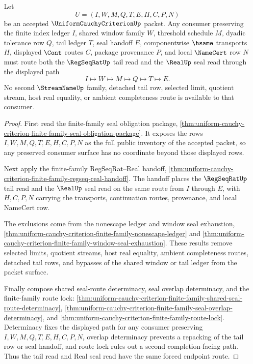 \begin{theorem}
\label{thm:uniform-cauchy-criterion-finite-family-tail-seal-coprovenance-lock}
Let
$$
U=(I,W,M,Q,T,E,H,C,P,N)
$$
be an accepted $\UniformCauchyCriterionUp$ packet. Any consumer preserving the
finite index ledger $I$, shared window family $W$, threshold schedule $M$,
dyadic tolerance row $Q$, tail ledger $T$, seal handoff $E$, componentwise
$\hsame$ transports $H$, displayed $\Cont$ routes $C$, package provenance $P$,
and local $\NameCert$ row $N$ must route both the $\RegSeqRatUp$ tail read and
the $\RealUp$ seal read through the displayed path
$$
I \longmapsto W \longmapsto M \longmapsto Q \longmapsto T \longmapsto E.
$$
No second $\StreamNameUp$ family, detached tail row, selected limit, quotient
stream, host real equality, or ambient completeness route is available to that
consumer.
\end{theorem}
\begin{proof}
First read the finite-family seal obligation package,
\autoref{thm:uniform-cauchy-criterion-finite-family-seal-obligation-package}.
It exposes the rows $I,W,M,Q,T,E,H,C,P,N$ as the full public inventory of the
accepted packet, so any preserved consumer surface has no coordinate beyond
those displayed rows.

Next apply the finite-family RegSeqRat--Real handoff,
\autoref{thm:uniform-cauchy-criterion-finite-family-regseq-real-handoff}. The
handoff places the $\RegSeqRatUp$ tail read and the $\RealUp$ seal read on the
same route from $I$ through $E$, with $H,C,P,N$ carrying the transports,
continuation routes, provenance, and local NameCert row.

The exclusions come from the nonescape ledger and window seal exhaustion,
\autoref{thm:uniform-cauchy-criterion-finite-family-nonescape-ledger} and
\autoref{thm:uniform-cauchy-criterion-finite-family-window-seal-exhaustion}.
These results remove selected limits, quotient streams, host real equality,
ambient completeness routes, detached tail rows, and bypasses of the shared
window or tail ledger from the packet surface.

Finally compose shared seal-route determinacy, seal overlap determinacy, and
the finite-family route lock:
\autoref{thm:uniform-cauchy-criterion-finite-family-shared-seal-route-determinacy},
\autoref{thm:uniform-cauchy-criterion-finite-family-seal-overlap-determinacy},
and \autoref{thm:uniform-cauchy-criterion-finite-family-route-lock}.
Determinacy fixes the displayed path for any consumer preserving
$I,W,M,Q,T,E,H,C,P,N$, overlap determinacy prevents a repacking of the tail row
or seal handoff, and route lock rules out a second completion-facing path. Thus
the tail read and Real seal read have the same forced endpoint route.
\end{proof}

